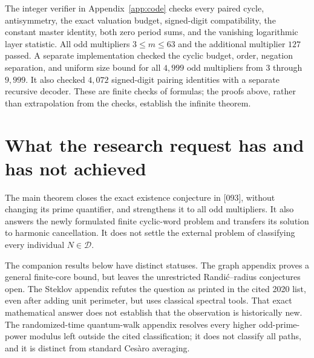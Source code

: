 \documentclass[11pt,a4paper]{article}
\theoremstyle{definition}\newtheorem{definition}[theorem]{Definition}
\theoremstyle{remark}\newtheorem{remark}[theorem]{Remark}
\newcommand{\Dset}{\mathcal D}\newcommand{\wt}{\operatorname{wt}}
\begin{document}
The integer verifier in Appendix~\ref{app:code} checks every paired
cycle, antisymmetry, the exact valuation budget, signed-digit compatibility,
the constant master identity, both zero period sums, and the vanishing
logarithmic layer statistic. All odd multipliers $3\le m\le63$ and
the additional multiplier $127$ passed. A separate implementation
checked the cyclic budget, order, negation separation, and uniform size
bound for all $4,999$ odd multipliers from $3$ through $9,999$.
It also checked $4,072$ signed-digit pairing identities with a separate
recursive decoder. These are finite checks of formulas; the proofs
above, rather than extrapolation from the checks, establish the infinite theorem.

\section{What the research request has and has not achieved}
The main theorem closes the exact existence conjecture in [093], without
changing its prime quantifier, and strengthens it to all odd multipliers.
It also answers the newly formulated finite cyclic-word problem and
transfers its solution to harmonic cancellation. It does not settle the
external problem of classifying every individual $N\in\Dset$.

The companion results below have distinct statuses. The graph
appendix proves a general finite-core bound, but leaves the unrestricted
Randi\'c--radius conjectures open. The Steklov appendix refutes the
question as printed in the cited 2020 list, even after adding unit
perimeter, but uses classical spectral tools. That exact mathematical
answer does not establish that the observation is historically new.
The randomized-time quantum-walk appendix resolves every higher odd-prime-power
modulus left outside the cited classification; it does not
classify all paths, and it is distinct from standard Ces\`aro averaging.
\end{document}
